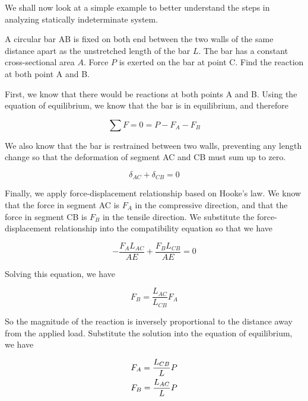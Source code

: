 \documentclass[
10pt,
a4paper,
openany,
svgnames,
]{kaobook} %
\begin{document}
We shall now look at a simple example to better understand the steps in analyzing statically indeterminate system.

\begin{example}
  A circular bar AB is fixed on both end between the two walls of the same distance apart as the unstretched length of the bar $L$. The bar has a constant cross-sectional area $A$. Force $P$ is exerted on the bar at point C. Find the reaction at both point A and B.
  \centering
\end{example}
\begin{solution}
First, we know that there would be reactions at both points A and B. Using the equation of equilibrium, we know that the bar is in equilibrium, and therefore

\[\sum F  = 0 = P - {F_A} - {F_B}\]

We also know that the bar is restrained between two walls, preventing any length change so that the deformation of segment AC and CB must sum up to zero.

\[{\delta _{AC}} + {\delta _{CB}} = 0\]

Finally, we apply force-displacement relationship based on Hooke’s law. We know that the force in segment AC is $F_A$ in the compressive direction, and that the force in segment CB is $F_B$ in the tensile direction. We substitute the force-displacement relationship into the compatibility equation so that we have

\[ - \frac{{{F_A}{L_{AC}}}}{{AE}} + \frac{{{F_B}{L_{CB}}}}{{AE}} = 0\]	

Solving this equation, we have

\[{F_B} = \frac{{{L_{AC}}}}{{{L_{CB}}}}{F_A}\]	

So the magnitude of the reaction is inversely proportional to the distance away from the applied load. Substitute the solution into the equation of equilibrium, we have

\[\begin{gathered}
  {F_A} = \frac{{{L_{CB}}}}{L}P \hfill \\
  {F_B} = \frac{{{L_{AC}}}}{L}P \hfill \\ 
\end{gathered} \]
\end{solution}
\end{document}
